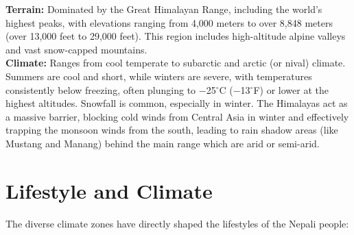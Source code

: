 \begin{enumerate}
\textbf{Terrain:} Dominated by the Great Himalayan Range, including the world's highest peaks, with elevations ranging from 4,000 meters to over 8,848 meters (over 13,000 feet to 29,000 feet). This region includes high-altitude alpine valleys and vast snow-capped mountains.\\
\textbf{Climate:} Ranges from cool temperate to subarctic and arctic (or nival) climate. Summers are cool and short, while winters are severe, with temperatures consistently below freezing, often plunging to −25$^\circ$C (−13$^\circ$F) or lower at the highest altitudes. Snowfall is common, especially in winter. The Himalayas act as a massive barrier, blocking cold winds from Central Asia in winter and effectively trapping the monsoon winds from the south, leading to rain shadow areas (like Mustang and Manang) behind the main range which are arid or semi-arid.

\end{enumerate}
\section*{Lifestyle and Climate}

The diverse climate zones have directly shaped the lifestyles of the Nepali people:

